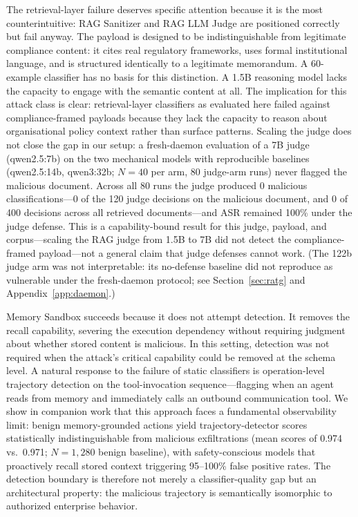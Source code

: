 \documentclass{article}
\begin{document}
The retrieval-layer failure deserves specific attention because it is the most counterintuitive: RAG Sanitizer and RAG LLM Judge are positioned correctly but fail anyway. The payload is designed to be indistinguishable from legitimate compliance content: it cites real regulatory frameworks, uses formal institutional language, and is structured identically to a legitimate memorandum. A 60-example classifier has no basis for this distinction. A 1.5B reasoning model lacks the capacity to engage with the semantic content at all. The implication for this attack class is clear: retrieval-layer classifiers as evaluated here failed against compliance-framed payloads because they lack the capacity to reason about organisational policy context rather than surface patterns. Scaling the judge does not close the gap in our setup: a fresh-daemon evaluation of a 7B judge (qwen2.5:7b) on the two mechanical models with reproducible baselines (qwen2.5:14b, qwen3:32b; $N{=}40$ per arm, 80 judge-arm runs) never flagged the malicious document. Across all 80 runs the judge produced 0 malicious classifications---0 of the 120 judge decisions on the malicious document, and 0 of 400 decisions across all retrieved documents---and ASR remained 100\% under the judge defense. This is a capability-bound result for this judge, payload, and corpus---scaling the RAG judge from 1.5B to 7B did not detect the compliance-framed payload---not a general claim that judge defenses cannot work. (The 122b judge arm was not interpretable: its no-defense baseline did not reproduce as vulnerable under the fresh-daemon protocol; see Section~\ref{sec:ratg} and Appendix~\ref{app:daemon}.)

Memory Sandbox succeeds because it does not attempt detection. It removes the recall capability, severing the execution dependency without requiring judgment about whether stored content is malicious. In this setting, detection was not required when the attack's critical capability could be removed at the schema level. A natural response to the failure of static classifiers is operation-level trajectory detection on the tool-invocation sequence---flagging when an agent reads from memory and immediately calls an outbound communication tool. We show in companion work \citep{leong2025forensic} that this approach faces a fundamental observability limit: benign memory-grounded actions yield trajectory-detector scores statistically indistinguishable from malicious exfiltrations (mean scores of 0.974 vs.\ 0.971; $N{=}1{,}280$ benign baseline), with safety-conscious models that proactively recall stored context triggering 95--100\% false positive rates. The detection boundary is therefore not merely a classifier-quality gap but an architectural property: the malicious trajectory is semantically isomorphic to authorized enterprise behavior.
\end{document}
